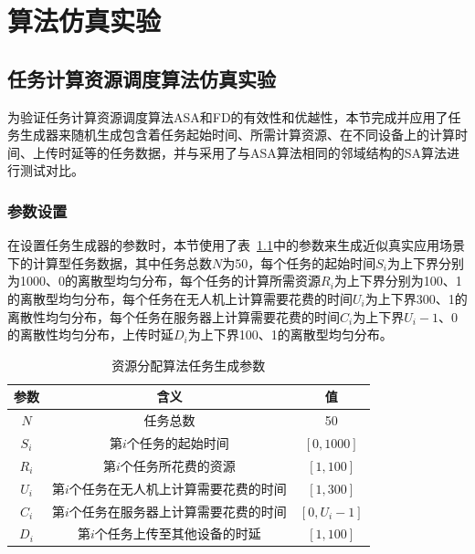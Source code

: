 \chapter{算法仿真实验}

\section{任务计算资源调度算法仿真实验}

为验证任务计算资源调度算法ASA和FD的有效性和优越性，本节完成并应用了任务生成器来随机生成包含着任务起始时间、所需计算资源、在不同设备上的计算时间、上传时延等的任务数据，并与采用了与ASA算法相同的邻域结构的SA算法进行测试对比。

\subsection{参数设置}

在设置任务生成器的参数时，本节使用了表~\ref{tab:资源分配算法任务生成参数}中的参数来生成近似真实应用场景下的计算型任务数据，其中任务总数\( N \)为50，每个任务的起始时间\(S_i\)为上下界分别为1000、0的离散型均匀分布，每个任务的计算所需资源\(R_i\)为上下界分别为100、1的离散型均匀分布，每个任务在无人机上计算需要花费的时间\(U_i\)为上下界300、1的离散性均匀分布，每个任务在服务器上计算需要花费的时间\(C_i\)为上下界\(U_i-1\)、0的离散性均匀分布，上传时延\(D_i\)为上下界100、1的离散型均匀分布。

\begin{table}[!htbp]
    \caption{资源分配算法任务生成参数}
    \label{tab:资源分配算法任务生成参数}
    \centering
    \begin{tabular}{c c c}
        \toprule
        \textbf{参数} & \textbf{含义} & \textbf{值}\\
        \midrule
        \( N \) & 任务总数 & 50 \\
        \( S_i \) & 第\(i\)个任务的起始时间 & \([0, 1000]\) \\
        \( R_i \) & 第\(i\)个任务所花费的资源 & \([1, 100]\) \\
        \( U_i \) & 第\(i\)个任务在无人机上计算需要花费的时间 & \([1, 300]\) \\
        \( C_i \) & 第\(i\)个任务在服务器上计算需要花费的时间 & \([0, U_i-1]\) \\
        \( D_i \) & 第\(i\)个任务上传至其他设备的时延 & \([1, 100]\) \\
        \bottomrule
    \end{tabular}
\end{table}

